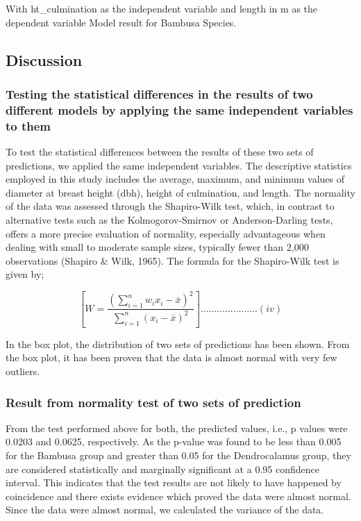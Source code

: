 \documentclass[preprint, 3p,
authoryear]{elsarticle} %
\begin{document}
With ht\_culmination as the independent variable and length in m as the
dependent variable Model result for Bambusa Species.

\hypertarget{discussion}{%
\subsection{Discussion}\label{discussion}}

\hypertarget{testing-the-statistical-differences-in-the-results-of-two-different-models-by-applying-the-same-independent-variables-to-them}{%
\subsubsection{Testing the statistical differences in the results of two
different models by applying the same independent variables to
them}\label{testing-the-statistical-differences-in-the-results-of-two-different-models-by-applying-the-same-independent-variables-to-them}}

To test the statistical differences between the results of these two
sets of predictions, we applied the same independent variables. The
descriptive statistics employed in this study includes the average,
maximum, and minimum values of diameter at breast height (dbh), height
of culmination, and length. The normality of the data was assessed
through the Shapiro-Wilk test, which, in contrast to alternative tests
such as the Kolmogorov-Smirnov or Anderson-Darling tests, offers a more
precise evaluation of normality, especially advantageous when dealing
with small to moderate sample sizes, typically fewer than 2,000
observations (Shapiro \& Wilk, 1965). The formula for the Shapiro-Wilk
test is given by;

\[[ W = \frac{{\left(\sum_{i=1}^{n} w_i x_i - \bar{x}\right)^2}}{{\sum_{i=1}^{n} (x_i - \bar{x})^2}}].....................(iv)\]

In the box plot, the distribution of two sets of predictions has been
shown. From the box plot, it has been proven that the data is almost
normal with very few outliers.

\hypertarget{result-from-normality-test-of-two-sets-of-prediction}{%
\subsubsection{Result from normality test of two sets of
prediction}\label{result-from-normality-test-of-two-sets-of-prediction}}

From the test performed above for both, the predicted values, i.e., p
values were 0.0203 and 0.0625, respectively. As the p-value was found to
be less than 0.005 for the Bambusa group and greater than 0.05 for the
Dendrocalamus group, they are considered statistically and marginally
significant at a 0.95 confidence interval. This indicates that the test
results are not likely to have happened by coincidence and there exists
evidence which proved the data were almost normal. Since the data were
almost normal, we calculated the variance of the data.
\end{document}
